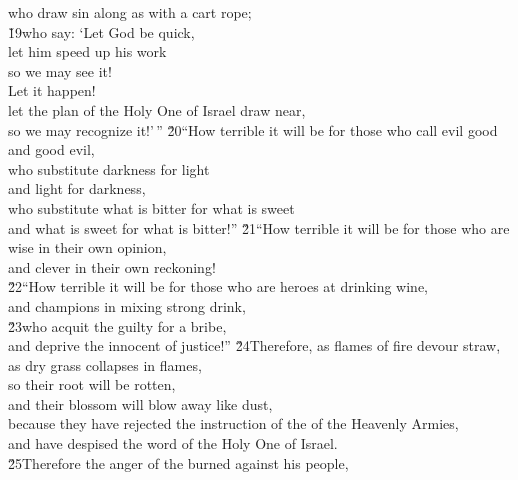 \begin{poetry}
\poemll    who draw sin along as with a cart rope; \\
\poeml \v{19}who say: `Let God be quick, \\
\poemll    let him speed up his work \\
\poemlll       so we may see it! \\
\poeml Let it happen! \\
\poemll    let the plan of the Holy One of Israel draw near, \\
\poemlll       so we may recognize it!'\,''
\poeml \v{20}``How terrible it will be for those who call evil good \\
\poemll    and good evil, \\
\poeml who substitute darkness for light \\
\poemll    and light for darkness, \\
\poeml who substitute what is bitter for what is sweet \\
\poemll    and what is sweet for what is bitter!''
\poeml \v{21}``How terrible it will be for those who are wise in their own opinion, \\
\poemll    and clever in their own reckoning! \\
\poeml \v{22}``How terrible it will be for those who are heroes at drinking wine, \\
\poemll    and champions in mixing strong drink, \\
\poeml \v{23}who acquit the guilty for a bribe, \\
\poemll    and deprive the innocent of justice!''
\poeml \v{24}Therefore, as flames of fire devour straw, \\
\poemll    as dry grass collapses in flames, \\
\poeml so their root will be rotten, \\
\poemll    and their blossom will blow away like dust, \\
\poeml because they have rejected the instruction of the  of the Heavenly Armies, \\
\poemll    and have despised the word of the Holy One of Israel. \\
\poeml \v{25}Therefore the anger of the  burned against his people, \\

\end{poetry}
